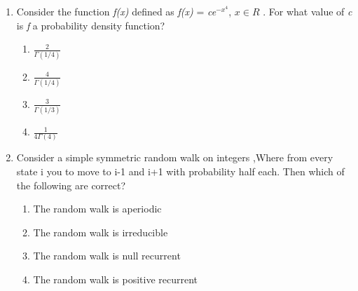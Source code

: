 \begin{enumerate}[label=\thesection.\arabic*.,ref=\thesection.\theenumi]
\begin{enumerate}
\end{enumerate}
%
\solution

%
\item Consider the function \textit{f(x)} defined as \textit{f(x)} = \textit{ce$^{-x^{4}}$}, $\textit{x} \in R$ . For what value of \textit{c} is \textit{f} a probability density function?\\
\begin{enumerate}
    \item $\displaystyle\frac{2}{\Gamma(1/4)}$\\\label{june/2019/52/option 1}
    \item $\displaystyle\frac{4}{\Gamma(1/4)}$\\
    \item $\displaystyle\frac{3}{\Gamma(1/3)}$\\
    \item $\displaystyle\frac{1}{4\Gamma(4)}$
\end{enumerate}
%
\solution

%
\item Consider a simple symmetric random walk on integers ,Where from every state i you to move to i-1 and i+1 with  probability half each. Then which of the following are correct?
\begin{enumerate}
    \item The random walk is aperiodic
    \item The random walk is irreducible
    \item The random walk is null recurrent 
    \item The random walk is positive recurrent 
\end{enumerate}
%
\solution


\end{enumerate}

